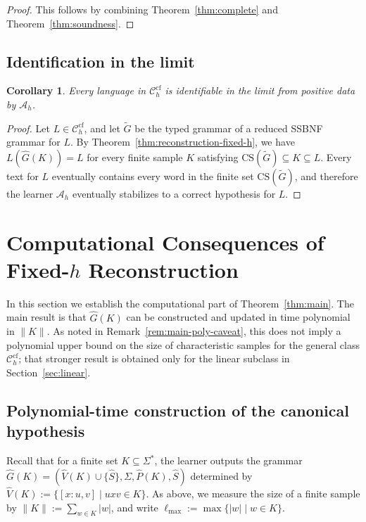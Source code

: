 \documentclass[11pt,a4paper]{article}
\newtheorem{corollary}[theorem]{Corollary}
\newcommand{\CS}{\mathrm{CS}}
\newcommand{\cf}{\mathrm{cf}}
\newcommand{\Ccf}[1]{\mathcal C_{#1}^{\cf}}
\begin{document}
\begin{proof}
This follows by combining Theorem~\ref{thm:complete} and Theorem~\ref{thm:soundness}.
\end{proof}

\subsection{Identification in the limit}

\begin{corollary}
\label{cor:ilt}
Every language in $\Ccf{h}$ is identifiable in the limit from positive data by $\mathcal A_h$.
\end{corollary}

\begin{proof}
Let $L\in\Ccf{h}$, and let $\widetilde G$ be the typed grammar of a reduced SSBNF grammar for $L$. By Theorem~\ref{thm:reconstruction-fixed-h}, we have $L(\hat G(K))=L$ for every finite sample $K$ satisfying $\CS(\widetilde G)\subseteq K\subseteq L$. Every text for $L$ eventually contains every word in the finite set $\CS(\widetilde G)$, and therefore the learner $\mathcal A_h$ eventually stabilizes to a correct hypothesis for $L$.
\end{proof}



\section{Computational Consequences of Fixed-\texorpdfstring{$h$}{h} Reconstruction}
\label{sec:complexity}

In this section we establish the computational part of Theorem~\ref{thm:main}. The main result is that $\hat G(K)$ can be constructed and updated in time polynomial in $\|K\|$. As noted in Remark~\ref{rem:main-poly-caveat}, this does not imply a polynomial upper bound on the size of characteristic samples for the general class $\Ccf{h}$; that stronger result is obtained only for the linear subclass in Section~\ref{sec:linear}.

\subsection{Polynomial-time construction of the canonical hypothesis}

Recall that for a finite set $K\subseteq\Sigma^*$, the learner outputs the grammar $\hat G(K)=(\hat V(K)\cup\{\hat S\},\Sigma,\hat P(K),\hat S)$ determined by $\hat V(K):=\{[x:u,v]\mid uxv\in K\}$. As above, we measure the size of a finite sample by $\|K\|:=\sum_{w\in K}|w|$, and write $\ell_{\max}:=\max\{|w|\mid w\in K\}$.
\end{document}
